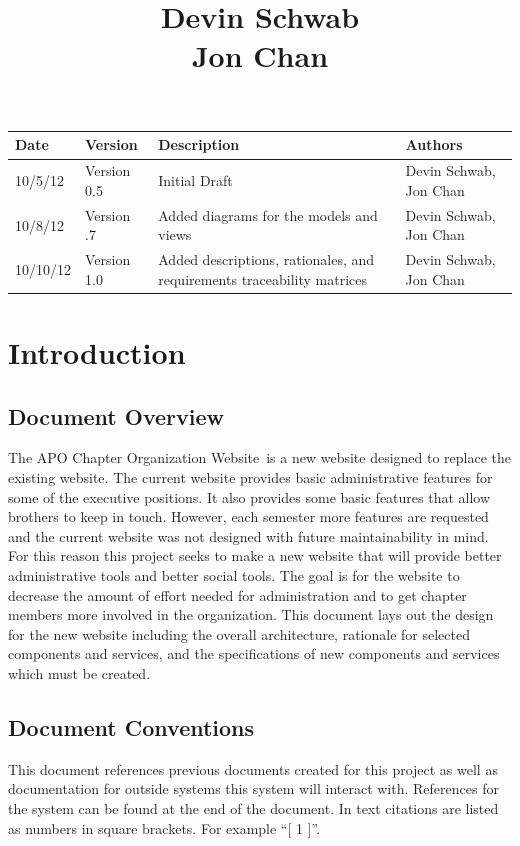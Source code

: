 \documentclass{article}
\title{\projName \\ \vspace{10 mm}
\docName \\ \vspace{10 mm}
Devin Schwab\\
Jon Chan}
\date{\docDate}
\newcommand{\projName}{APO Chapter Organization Website}
\begin{document}


\maketitle

\newpage

\begin{longtable}{|p{}|p{}|p{}|p{}|}
\hline
{\bf Date} & {\bf Version} & {\bf Description} & {\bf Authors} \\ \hline
10/5/12 & Version 0.5 & Initial Draft & Devin Schwab, Jon Chan \\ \hline
10/8/12 & Version .7 & Added diagrams for the models and views & Devin Schwab, Jon Chan \\ \hline
10/10/12 & Version 1.0 & Added descriptions, rationales, and requirements traceability matrices & Devin Schwab, Jon Chan \\ \hline
\end{longtable}

\newpage

\tableofcontents
\listoffigures

\newpage

\section{Introduction}

\subsection{Document Overview}
The \projName \, is a new website designed to replace the existing website.
The current website provides basic administrative features for some of the executive positions.
It also provides some basic features that allow brothers to keep in touch. However, each semester
more features are requested and the current website was not designed with future maintainability
in mind. For this reason this project seeks to make a new website that will provide better
administrative tools and better social tools. The goal is for the website to decrease the amount of effort
needed for administration and to get chapter members more involved in the organization. This document lays out
the design for the new website including the overall architecture, rationale for selected components and
services, and the specifications of new components and services which must be created.

\subsection{Document Conventions}
This document references previous documents created for this project as well as documentation
for outside systems this system will interact with. References for the system can be found at the end of the document.
In text citations are listed as numbers in square brackets. For example ``[ 1 ]''. 
\end{document}
